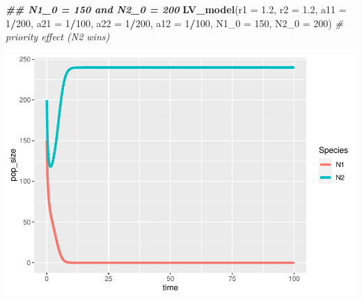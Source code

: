 \documentclass[
]{book}
\newenvironment{Shaded}{\begin{snugshade}}{\end{snugshade}}
\newcommand{\AttributeTok}[1]{\textcolor[rgb]{0.13,0.29,0.53}{#1}}
\newcommand{\CommentTok}[1]{\textcolor[rgb]{0.56,0.35,0.01}{\textit{#1}}}
\newcommand{\DecValTok}[1]{\textcolor[rgb]{0.00,0.00,0.81}{#1}}
\newcommand{\DocumentationTok}[1]{\textcolor[rgb]{0.56,0.35,0.01}{\textbf{\textit{#1}}}}
\newcommand{\FloatTok}[1]{\textcolor[rgb]{0.00,0.00,0.81}{#1}}
\newcommand{\FunctionTok}[1]{\textcolor[rgb]{0.13,0.29,0.53}{\textbf{#1}}}
\newcommand{\NormalTok}[1]{#1}
\newcommand{\SpecialCharTok}[1]{\textcolor[rgb]{0.81,0.36,0.00}{\textbf{#1}}}
\begin{document}
\begin{Shaded}
\begin{Highlighting}[]
  \DocumentationTok{\#\# N1\_0 = 150 and N2\_0 = 200}
  \FunctionTok{LV\_model}\NormalTok{(}\AttributeTok{r1 =} \FloatTok{1.2}\NormalTok{, }\AttributeTok{r2 =} \FloatTok{1.2}\NormalTok{, }\AttributeTok{a11 =} \DecValTok{1}\SpecialCharTok{/}\DecValTok{200}\NormalTok{, }\AttributeTok{a21 =} \DecValTok{1}\SpecialCharTok{/}\DecValTok{100}\NormalTok{, }\AttributeTok{a22 =} \DecValTok{1}\SpecialCharTok{/}\DecValTok{200}\NormalTok{, }\AttributeTok{a12 =} \DecValTok{1}\SpecialCharTok{/}\DecValTok{100}\NormalTok{, }\AttributeTok{N1\_0 =} \DecValTok{150}\NormalTok{, }\AttributeTok{N2\_0 =} \DecValTok{200}\NormalTok{)  }\CommentTok{\# priority effect (N2 wins)}
\end{Highlighting}
\end{Shaded}

\includegraphics{bookdown-demo_files/figure-latex/unnamed-chunk-21-8.pdf}
\end{document}
